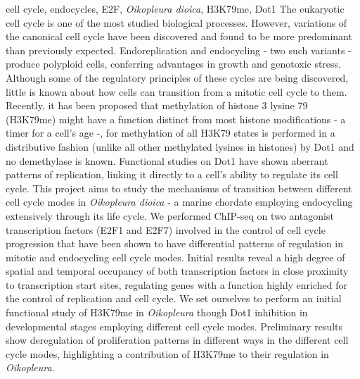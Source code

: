 \documentclass[11pt,twoside,a4paper]{report}
\begin{document}
\cleardoublepage


\TitlePage
    \vspace*{55mm}
        {cell cycle, endocycles, E2F, \textit{Oikopleura dioica}, H3K79me, Dot1}
		{The eukaryotic cell cycle is one of the most studied biological processes. However, variations of the canonical cell cycle have been discovered and found to be more predominant than previously expected. Endoreplication and endocycling - two such variants - produce polyploid cells, conferring advantages in growth and genotoxic stress. Although some of the regulatory principles of these cycles are being discovered, little is known about how cells can transition from a mitotic cell cycle to them.
		Recently, it has been proposed that methylation of histone 3 lysine 79 (H3K79me) might have a function distinct from most histone modifications - a timer for a cell's age -, for methylation of all H3K79 states is performed in a distributive fashion (unlike all other methylated lysines in histones) by Dot1 and no demethylase is known. Functional studies on Dot1 have shown aberrant patterns of replication, linking it directly to a cell's ability to regulate its cell cycle.
		This project aims to study the mechanisms of transition between different cell cycle modes in \textit{Oikopleura dioica} - a marine chordate employing endocycling extensively through its life cycle.
		We performed ChIP-seq on two antagonist transcription factors (E2F1 and E2F7) involved in the control of cell cycle progression that have been shown to have differential patterns of regulation in mitotic and endocycling cell cycle modes. Initial results reveal a high degree of spatial and temporal occupancy of both transcription factors in close proximity to transcription start sites, regulating genes with a function highly enriched for the control of replication and cell cycle. We set ourselves to perform an initial functional study of H3K79me in \textit{Oikopleura} though Dot1 inhibition in developmental stages employing different cell cycle modes. Preliminary results show deregulation of proliferation patterns in different ways in the different cell cycle modes, highlighting a contribution of H3K79me to their regulation in \textit{Oikopleura}.
		}
\EndTitlePage

\cleardoublepage
\end{document}
